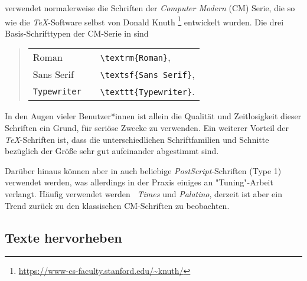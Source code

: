 \latex verwendet normalerweise die Schriften der \emph{Computer
Modern}
(CM) Serie, die so wie die \emph{TeX}-Software selbst von Donald Knuth%
\footnote{\url{https://www-cs-faculty.stanford.edu/~knuth/}} entwickelt
wurden. Die drei Basis-Schrifttypen der CM-Serie in \latex sind
%
\begin{quote}
\begin{tabular}{lcl}
\textrm{Roman}      & & \verb!\textrm{Roman}!,\\
\textsf{Sans Serif} & & \verb!\textsf{Sans Serif}!,\\
\texttt{Typewriter} & & \verb!\texttt{Typewriter}!.\\
\end{tabular}
\end{quote}
%
\noindent In den Augen vieler Benutzer*innen ist allein die Qualität und
Zeitlosigkeit dieser Schriften ein Grund, \latex für seriöse
Zwecke zu verwenden. Ein weiterer Vorteil der \emph{TeX}-Schriften
ist, dass die unterschiedlichen Schriftfamilien und Schnitte
bezüglich der Größe sehr gut aufeinander abgestimmt sind.

Darüber hinaus können aber in \latex auch beliebige 
\emph{PostScript}-Schrif\-ten (Type 1) verwendet werden, was allerdings in
der Praxis einiges an "Tuning"-Arbeit verlangt. Häufig verwendet
werden \zB\ \emph{Times} und \emph{Palatino}, derzeit ist aber ein Trend 
zurück zu den klassischen CM-Schriften zu beobachten.



\subsection{Texte hervorheben}


